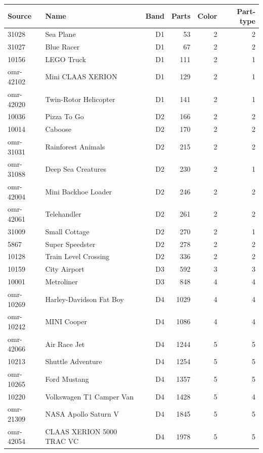 \begin{tabular}{@{}llrrrr@{}}
\toprule
Source & Name & Band & Parts & Color & Part-type\\
\midrule
31028 & Sea Plane & D1 & 53 & 2 & 2\\
31027 & Blue Racer & D1 & 67 & 2 & 2\\
10156 & LEGO Truck & D1 & 111 & 2 & 1\\
omr-42102 & Mini CLAAS XERION & D1 & 129 & 2 & 1\\
omr-42020 & Twin-Rotor Helicopter & D1 & 141 & 2 & 1\\
10036 & Pizza To Go & D2 & 166 & 2 & 2\\
10014 & Caboose & D2 & 170 & 2 & 2\\
omr-31031 & Rainforest Animals & D2 & 215 & 2 & 2\\
omr-31088 & Deep Sea Creatures & D2 & 230 & 2 & 1\\
omr-42004 & Mini Backhoe Loader & D2 & 246 & 2 & 2\\
omr-42061 & Telehandler & D2 & 261 & 2 & 2\\
31009 & Small Cottage & D2 & 270 & 2 & 1\\
5867 & Super Speedster & D2 & 278 & 2 & 2\\
10128 & Train Level Crossing & D2 & 336 & 2 & 2\\
10159 & City Airport & D3 & 592 & 3 & 3\\
10001 & Metroliner & D3 & 848 & 4 & 4\\
omr-10269 & Harley-Davidson Fat Boy & D4 & 1029 & 4 & 4\\
omr-10242 & MINI Cooper & D4 & 1086 & 4 & 4\\
omr-42066 & Air Race Jet & D4 & 1244 & 5 & 5\\
10213 & Shuttle Adventure & D4 & 1254 & 5 & 5\\
omr-10265 & Ford Mustang & D4 & 1357 & 5 & 5\\
10220 & Volkswagen T1 Camper Van & D4 & 1428 & 5 & 4\\
omr-21309 & NASA Apollo Saturn V & D4 & 1845 & 5 & 5\\
omr-42054 & CLAAS XERION 5000 TRAC VC & D4 & 1978 & 5 & 5\\
\bottomrule
\end{tabular}
